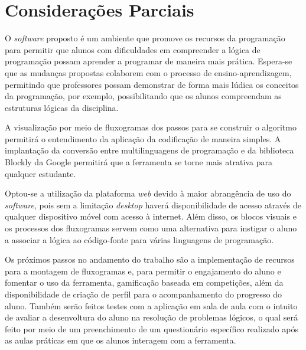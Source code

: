 \documentclass[12pt]{article}
\begin{document}
\section{Considerações Parciais}
O \textit{software} proposto é um ambiente que promove os recursos da programação para permitir que alunos com dificuldades em compreender a lógica de programação possam aprender a programar de maneira mais prática. Espera-se que as mudanças propostas colaborem com o processo de ensino-aprendizagem, permitindo que professores possam demonstrar de forma mais lúdica os conceitos da programação, por exemplo, possibilitando que os alunos compreendam as estruturas lógicas da disciplina.
\par A visualização por meio de fluxogramas dos passos para se construir o algoritmo permitirá o entendimento da aplicação da codificação de maneira simples. A implantação da conversão entre multilinguagens de programação e da biblioteca Blockly da Google permitirá que a ferramenta se torne mais atrativa para qualquer estudante. 
\par Optou-se a utilização da plataforma \textit{web} devido à maior abrangência de uso do \textit{software}, pois sem a limitação \textit{desktop} haverá disponibilidade de acesso através de qualquer dispositivo móvel com acesso à internet. Além disso, os blocos visuais e os processos dos fluxogramas servem como uma alternativa para instigar o aluno a associar a lógica ao código-fonte para várias linguagens de programação. 
\par Os próximos passos no andamento do trabalho são a implementação de recursos para a montagem de fluxogramas e, para permitir o engajamento do aluno e fomentar o uso da ferramenta, gamificação baseada em competições, além da disponibilidade de criação de perfil para o acompanhamento do progresso do aluno. Também serão feitos testes com a aplicação em sala de aula com o intuito de avaliar a desenvoltura do aluno na resolução de problemas lógicos, o qual será feito por meio de um preenchimento de um questionário específico realizado após as aulas práticas em que os alunos interagem com a ferramenta.



\end{document}
